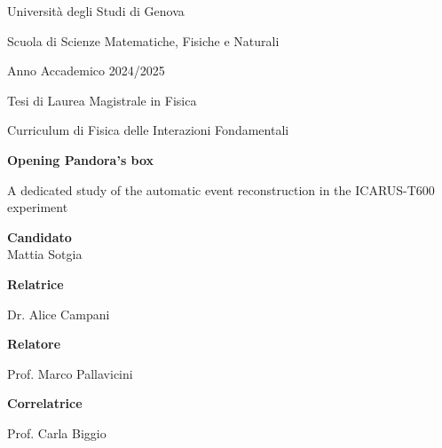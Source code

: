 \begin{titlepage}
    \ifdraft\BgThispage\fi
    \begin{center}
        
        {{Università degli Studi di Genova}}\par

        {Scuola di Scienze Matematiche, Fisiche e Naturali} \par

        \vspace{0.5cm}

        {Anno Accademico 2024/2025}

        \vfill

        Tesi di Laurea Magistrale in Fisica\par
        Curriculum di Fisica delle Interazioni Fondamentali

        \vfill

        \begin{minipage}{0.775\linewidth}
            \centering
            \huge
            \bfseries
            {\LARGE Opening Pandora's box}\par%
            {\Large A dedicated study of the automatic event reconstruction in the ICARUS-T600 experiment}%
        \end{minipage}

        \vfill

        \textbf{\small Candidato}\\{Mattia Sotgia}%
%
        \vfill%

        \begin{minipage}{0.45\linewidth}%
            \textbf{\small Relatrice}\par%
            {Dr. Alice Campani}\par\vspace{1em}%
            \textbf{\small Relatore}\par%
            {Prof. Marco Pallavicini}%
        \end{minipage}%
        \hfill%
        \begin{minipage}{0.45\linewidth}
            \raggedleft
            \textbf{\small Correlatrice}\par
            {Prof. Carla Biggio}
        \end{minipage}


\end{center}
\end{titlepage}
